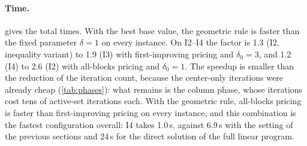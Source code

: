 \begin{table}[ht]
\centering
\small
\renewcommand{\arraystretch}{1.15}
\setlength{\tabcolsep}{3.5pt}
\caption{Total time of the column generation run in seconds. The fastest variant of each
pricing rule is in bold.}
\label{tab:adaptive-time}
\end{table}

\paragraph{Time.}  gives the total times. With the best base value,
the geometric rule is faster than the fixed parameter $\delta = 1$ on every instance. On
I2--I4 the factor is 1.3 (I2, inequality variant) to 1.9 (I3) with first-improving pricing
and $\delta_0 = 3$, and 1.2 (I4) to 2.6 (I2) with all-blocks pricing and $\delta_0 = 1$.
The speedup is smaller than the reduction of the iteration count, because the center-only
iterations were already cheap (\cref{tab:phases}): what remains is the column phase, whose
iterations cost tens of active-set iterations each. With the geometric rule, all-blocks
pricing is faster than first-improving pricing on every instance, and this combination is the
fastest configuration overall: I4 takes 1.0\,s, against 6.9\,s with the setting of the previous
sections and 24\,s for the direct solution of the full linear program.

